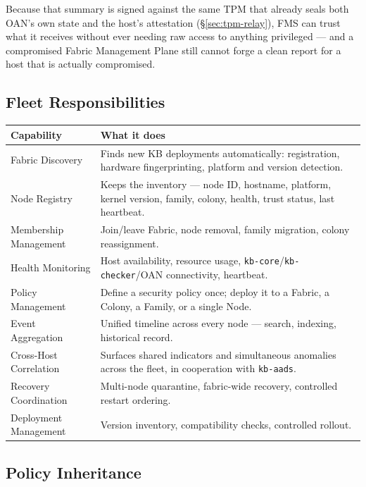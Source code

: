 \documentclass[11pt,a4paper]{article}
\begin{document}
Because that summary is signed against the same TPM that already seals
both OAN's own state and the host's attestation (\S\ref{sec:tpm-relay}),
FMS can trust what it receives without ever needing raw access to
anything privileged --- and a compromised Fabric Management Plane still
cannot forge a clean report for a host that is actually compromised.

\subsection{Fleet Responsibilities}

\begin{center}
\renewcommand{\arraystretch}{1.3}
\begin{tabular}{@{}p{4.0cm}p{9.6cm}@{}}
\toprule
\textbf{Capability} & \textbf{What it does} \\
\midrule
Fabric Discovery & Finds new KB deployments automatically: registration, hardware fingerprinting, platform and version detection. \\
Node Registry & Keeps the inventory --- node ID, hostname, platform, kernel version, family, colony, health, trust status, last heartbeat. \\
Membership Management & Join/leave Fabric, node removal, family migration, colony reassignment. \\
Health Monitoring & Host availability, resource usage, \texttt{kb-core}/\texttt{kb-checker}/OAN connectivity, heartbeat. \\
Policy Management & Define a security policy once; deploy it to a Fabric, a Colony, a Family, or a single Node. \\
Event Aggregation & Unified timeline across every node --- search, indexing, historical record. \\
Cross-Host Correlation & Surfaces shared indicators and simultaneous anomalies across the fleet, in cooperation with \texttt{kb-aads}. \\
Recovery Coordination & Multi-node quarantine, fabric-wide recovery, controlled restart ordering. \\
Deployment Management & Version inventory, compatibility checks, controlled rollout. \\
\bottomrule
\end{tabular}
\end{center}

\subsection{Policy Inheritance}
\end{document}
